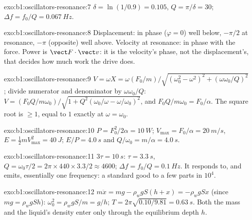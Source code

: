 \begin{solution}{exo:b1:oscillators-resonance:7}
$\delta = \ln(1/0.9) = 0.105$, $Q = \pi/\delta = 30$; $\Delta f = f_0/Q =
\qty{0.067}{Hz}$.
\end{solution}

\begin{solution}{exo:b1:oscillators-resonance:8}
Displacement: in phase ($\varphi = 0$) well below, $-\pi/2$ at
resonance, $-\pi$ (opposite) well above. Velocity at resonance: in
phase with the force. Power is $\vect F\cdot\vect v$: it is the velocity's
phase, not the displacement's, that decides how much work the drive
does.
\end{solution}

\begin{solution}{exo:b1:oscillators-resonance:9}
$V = \omega X = \omega(F_0/m)/\sqrt{(\omega_0^2 - \omega^2)^2 + (\omega\omega_0/Q)^2}$;
divide numerator and denominator by $\omega\omega_0/Q$: $V = (F_0Q/m\omega_0)/
\sqrt{1 + Q^2(\omega_0/\omega - \omega/\omega_0)^2}$, and $F_0Q/m\omega_0 = F_0/\alpha$.
The square root is $\geq 1$, equal to $1$ exactly at $\omega = \omega_0$.
\end{solution}

\begin{solution}{exo:b1:oscillators-resonance:10}
$P = F_0^2/2\alpha = \qty{10}{W}$; $V_{\max} = F_0/\alpha = \qty{20}{m/s}$,
$E = \tfrac12 mV_{\max}^2 = \qty{40}{J}$; $E/P = \qty{4.0}{s}$ and $Q/\omega_0 =
m/\alpha = \qty{4.0}{s}$.
\end{solution}

\begin{solution}{exo:b1:oscillators-resonance:11}
$3\tau = \qty{10}{s}$: $\tau = \qty{3.3}{s}$, $Q = \omega_0\tau/2 = 2\pi \times
440 \times 3.3/2 \approx 4600$; $\Delta f = f_0/Q = \qty{0.1}{Hz}$. It
responds to, and emits, essentially one frequency: a standard good to
a few parts in $10^4$.
\end{solution}

\begin{solution}{exo:b1:oscillators-resonance:12}
$m\ddot x = mg - \rho_wgS(h + x) = -\rho_wgSx$ (since $mg = \rho_wgSh$):
$\omega_0^2 = \rho_wgS/m = g/h$; $T = 2\pi\sqrt{0.10/9.81} = \qty{0.63}{s}$.
Both the mass and the liquid's density enter only through the
equilibrium depth $h$.
\end{solution}

